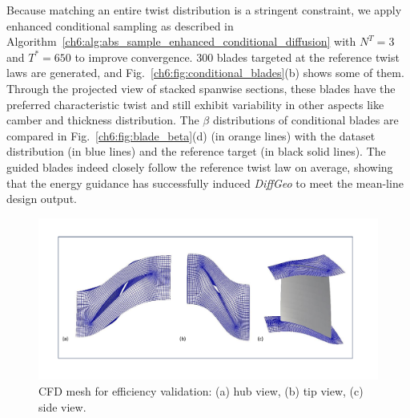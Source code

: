 Because matching an entire twist distribution is a stringent constraint, we apply enhanced conditional sampling as described in Algorithm~\ref{ch6:alg:abs_sample_enhanced_conditional_diffusion} with $N^T=3$ and $T^*=650$ to improve convergence. 300 blades targeted at the reference twist laws are generated, and Fig.~\ref{ch6:fig:conditional_blades}(b) shows some of them. Through the projected view of stacked spanwise sections, these blades have the preferred characteristic twist and still exhibit variability in other aspects like camber and thickness distribution. The $\beta$ distributions of conditional blades are compared in Fig.~\ref{ch6:fig:blade_beta}(d) (in orange lines) with the dataset distribution (in blue lines) and the reference target (in black solid lines). The guided blades indeed closely follow the reference twist law on average, showing that the energy guidance has successfully induced \textit{DiffGeo} to meet the mean-line design output.

\begin{figure}[!tb]
    \begin{center}
        \includegraphics[width=1\linewidth]{chapter6/fig/fig_blade_simulation_mesh.pdf}
    \end{center}
    \caption{
        \small CFD mesh for efficiency validation: (a) hub view, (b) tip view, (c) side view.
    }
    \label{ch6:fig:blade_simulation_mesh}
\end{figure}


